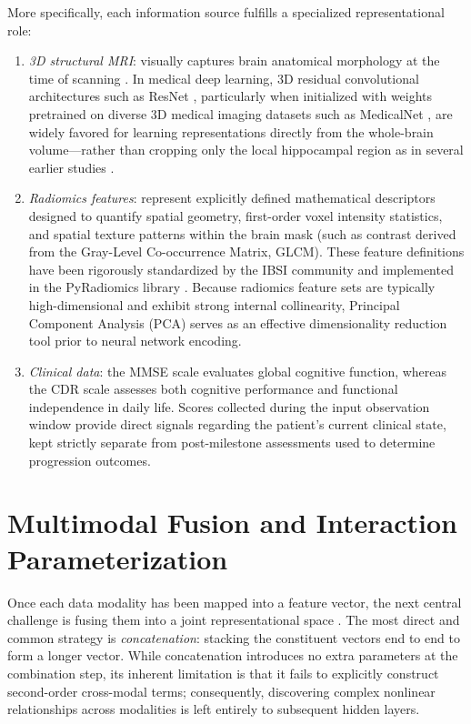More specifically, each information source fulfills a specialized representational role:
\begin{enumerate}
\item \emph{3D structural MRI}: visually captures brain anatomical morphology at the time of scanning \cite{jack2008adnimri}. In medical deep learning, 3D residual convolutional architectures such as ResNet \cite{he2016deep}, particularly when initialized with weights pretrained on diverse 3D medical imaging datasets such as MedicalNet \cite{chen2019med3d}, are widely favored for learning representations directly from the whole-brain volume---rather than cropping only the local hippocampal region as in several earlier studies \cite{li2019hippocampal}.
\item \emph{Radiomics features}: represent explicitly defined mathematical descriptors designed to quantify spatial geometry, first-order voxel intensity statistics, and spatial texture patterns within the brain mask (such as contrast derived from the Gray-Level Co-occurrence Matrix, GLCM). These feature definitions have been rigorously standardized by the IBSI community \cite{zwanenburg2020ibsi} and implemented in the PyRadiomics library \cite{vangriethuysen2017computational}. Because radiomics feature sets are typically high-dimensional and exhibit strong internal collinearity, Principal Component Analysis (PCA) \cite{jolliffe2016pca} serves as an effective dimensionality reduction tool prior to neural network encoding.
\item \emph{Clinical data}: the MMSE scale \cite{folstein1975mmse} evaluates global cognitive function, whereas the CDR scale \cite{morris1993cdr} assesses both cognitive performance and functional independence in daily life. Scores collected during the input observation window provide direct signals regarding the patient's current clinical state, kept strictly separate from post-milestone assessments used to determine progression outcomes.
\end{enumerate}

\section{Multimodal Fusion and Interaction Parameterization}
\label{sec:background-fusion}
Once each data modality has been mapped into a feature vector, the next central challenge is fusing them into a joint representational space \cite{baltrusaitis2019multimodal}. The most direct and common strategy is \emph{concatenation}: stacking the constituent vectors end to end to form a longer vector. While concatenation introduces no extra parameters at the combination step, its inherent limitation is that it fails to explicitly construct second-order cross-modal terms; consequently, discovering complex nonlinear relationships across modalities is left entirely to subsequent hidden layers.

